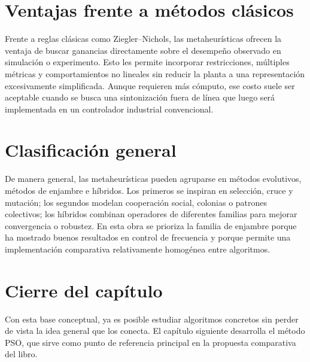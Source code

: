 \section{Ventajas frente a métodos clásicos}
Frente a reglas clásicas como Ziegler--Nichols, las metaheurísticas ofrecen la ventaja de buscar
ganancias directamente sobre el desempeño observado en simulación o experimento. Esto les
permite incorporar restricciones, múltiples métricas y comportamientos no lineales sin reducir
la planta a una representación excesivamente simplificada. Aunque requieren más cómputo, ese
costo suele ser aceptable cuando se busca una sintonización fuera de línea que luego será
implementada en un controlador industrial convencional.

\section{Clasificación general}
De manera general, las metaheurísticas pueden agruparse en métodos evolutivos, métodos de
enjambre e híbridos. Los primeros se inspiran en selección, cruce y mutación; los segundos
modelan cooperación social, colonias o patrones colectivos; los híbridos combinan operadores
de diferentes familias para mejorar convergencia o robustez. En esta obra se prioriza la familia
de enjambre porque ha mostrado buenos resultados en control de frecuencia y porque permite
una implementación comparativa relativamente homogénea entre algoritmos.

\section{Cierre del capítulo}
Con esta base conceptual, ya es posible estudiar algoritmos concretos sin perder de vista la
idea general que los conecta. El capítulo siguiente desarrolla el método PSO, que sirve como
punto de referencia principal en la propuesta comparativa del libro.
